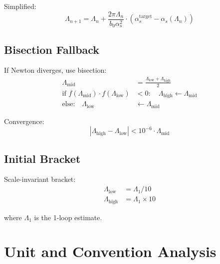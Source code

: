 \documentclass[11pt,a4paper]{article}
\theoremstyle{definition}
\begin{document}
Simplified:
\begin{equation}
\label{eq:app-newton-simple}
\Lambda_{n+1} = \Lambda_n + \frac{2\pi\Lambda_n}{b_0\alpha_s^2}
  \cdot (\alpha_s^{\text{target}} - \alpha_s(\Lambda_n))
\end{equation}

\subsection{Bisection Fallback}
\label{subsec:bisection}

If Newton diverges, use bisection:
\begin{align}
\label{eq:app-bisect-1}
\Lambda_{\text{mid}} &= \frac{\Lambda_{\text{low}} + \Lambda_{\text{high}}}{2} \\
\label{eq:app-bisect-2}
\text{if } f(\Lambda_{\text{mid}}) \cdot f(\Lambda_{\text{low}}) &< 0:
  \quad \Lambda_{\text{high}} \leftarrow \Lambda_{\text{mid}} \\
\label{eq:app-bisect-3}
\text{else:} \quad \Lambda_{\text{low}} &\leftarrow \Lambda_{\text{mid}}
\end{align}

Convergence:
\begin{equation}
\label{eq:app-bisect-conv}
|\Lambda_{\text{high}} - \Lambda_{\text{low}}| < 10^{-6} \cdot \Lambda_{\text{mid}}
\end{equation}

\subsection{Initial Bracket}
\label{subsec:init-bracket}

Scale-invariant bracket:
\begin{align}
\label{eq:app-bracket-low}
\Lambda_{\text{low}} &= \Lambda_1 / 10 \\
\label{eq:app-bracket-high}
\Lambda_{\text{high}} &= \Lambda_1 \times 10
\end{align}

where $\Lambda_1$ is the 1-loop estimate.

\section{Unit and Convention Analysis}
\label{app:units}
\end{document}
